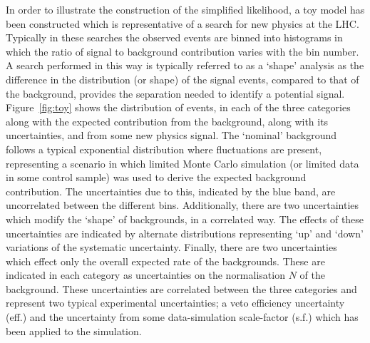 \documentclass[11pt]{article}
\begin{document}
In order to illustrate the construction of the simplified likelihood, a toy model has been constructed which is representative of a search for new physics at the LHC. Typically in these searches the observed events are binned into histograms in which the ratio of signal to background contribution varies with the bin number. A search performed in this way is typically referred to as a `shape' analysis as the difference in the distribution (or shape) of the signal events, compared to that of the background, provides the separation needed to identify a potential signal.
Figure~\ref{fig:toy} shows the distribution of events, in each of the three categories along with the expected contribution from the background, along with its uncertainties, and from some new physics signal.
The `nominal' background follows a typical exponential distribution where fluctuations are present, representing a scenario in which limited Monte Carlo simulation (or limited data in some control sample) was used
to derive the expected background contribution. The uncertainties due to this, indicated by the blue band, are uncorrelated between the different bins. Additionally, there are two uncertainties which modify the `shape' of
backgrounds, in a correlated way. The effects of these uncertainties are indicated by alternate distributions representing `up' and `down' variations of the systematic uncertainty. Finally, there are two uncertainties
which effect only the overall expected rate of the backgrounds. These are indicated in each category as uncertainties on the normalisation $N$ of the background. These uncertainties are correlated between the three categories
and represent two typical experimental uncertainties; a veto efficiency uncertainty (eff.) and the uncertainty from some data-simulation scale-factor (s.f.) which has been applied to the simulation.
\end{document}
